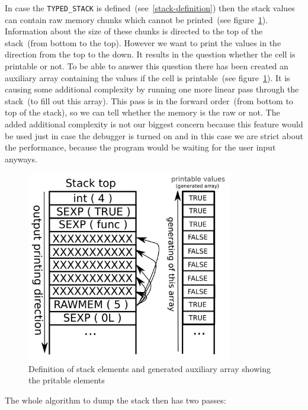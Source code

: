 \documentclass[thesis=M,english]{FITthesis}[2018/10/20]
\newcommand{\code}[1]{\texttt{#1}}
\begin{document}
In case the \code{TYPED{\_}STACK} is defined~(see~\ref{stack-definition}) then the stack values can contain raw memory chunks which cannot be printed~(see figure~\ref{fig:stack-elements-definition}). Information about the size of these chunks is directed to the top of the stack~(from bottom to the top). However we want to print the values in the direction from the top to the down. It results in the question whether the cell is printable or not. To be able to answer this question there has been created an auxiliary array containing the values if the cell is printable~(see figure~\ref{fig:stack-elements-definition}). It is causing some additional complexity by running one more linear pass through the stack~(to fill out this array). This pass is in the forward order~(from bottom to top of the stack), so we can tell whether the memory is the raw or not. The added additional complexity is not our biggest concern because this feature would be used just in case the debugger is turned on and in this case we are strict about the performance, because the program would be waiting for the user input anyways.

\begin{figure}[H]
	\includegraphics[width=90mm]{stack-rawmem.png}
	\caption{Definition of stack elements and generated auxiliary array showing the pritable elements}\label{fig:stack-elements-definition}
\end{figure}

The whole algorithm to dump the stack then has two passes:
\end{document}
